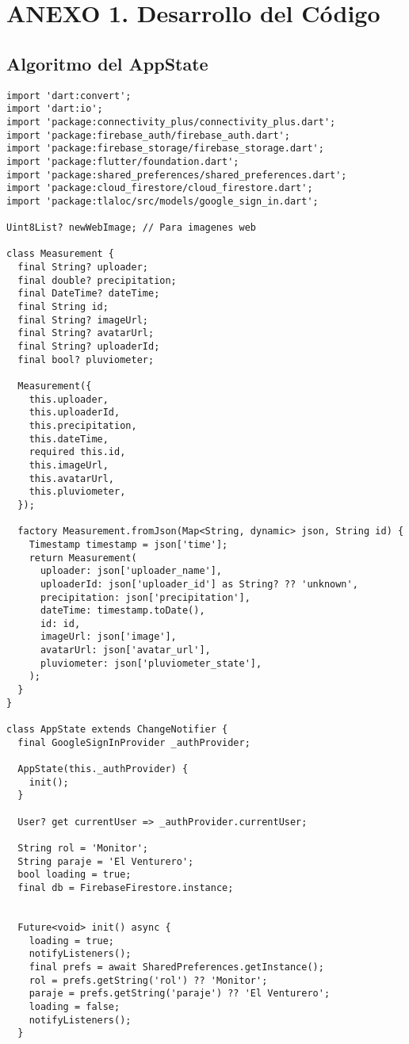 \chapter{ANEXO 1. Desarrollo del Código}

\section{Algoritmo del AppState}
\label{anexo:alg1}

\begin{verbatim}
import 'dart:convert';
import 'dart:io';
import 'package:connectivity_plus/connectivity_plus.dart';
import 'package:firebase_auth/firebase_auth.dart';
import 'package:firebase_storage/firebase_storage.dart';
import 'package:flutter/foundation.dart';
import 'package:shared_preferences/shared_preferences.dart';
import 'package:cloud_firestore/cloud_firestore.dart';
import 'package:tlaloc/src/models/google_sign_in.dart';

Uint8List? newWebImage; // Para imagenes web

class Measurement {
  final String? uploader;
  final double? precipitation;
  final DateTime? dateTime;
  final String id;
  final String? imageUrl;
  final String? avatarUrl;
  final String? uploaderId;
  final bool? pluviometer;

  Measurement({
    this.uploader,
    this.uploaderId,
    this.precipitation,
    this.dateTime,
    required this.id,
    this.imageUrl,
    this.avatarUrl,
    this.pluviometer,
  });

  factory Measurement.fromJson(Map<String, dynamic> json, String id) {
    Timestamp timestamp = json['time'];
    return Measurement(
      uploader: json['uploader_name'],
      uploaderId: json['uploader_id'] as String? ?? 'unknown',
      precipitation: json['precipitation'],
      dateTime: timestamp.toDate(),
      id: id,
      imageUrl: json['image'],
      avatarUrl: json['avatar_url'],
      pluviometer: json['pluviometer_state'],
    );
  }
}

class AppState extends ChangeNotifier {
  final GoogleSignInProvider _authProvider;

  AppState(this._authProvider) {
    init();
  }

  User? get currentUser => _authProvider.currentUser;

  String rol = 'Monitor';
  String paraje = 'El Venturero';
  bool loading = true;
  final db = FirebaseFirestore.instance;


  Future<void> init() async {
    loading = true;
    notifyListeners();
    final prefs = await SharedPreferences.getInstance();
    rol = prefs.getString('rol') ?? 'Monitor';
    paraje = prefs.getString('paraje') ?? 'El Venturero';
    loading = false;
    notifyListeners();
  }


\end{verbatim}
